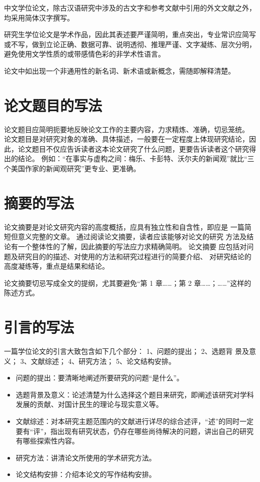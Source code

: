 中文学位论文，除古汉语研究中涉及的古文字和参考文献中引用的外文文献之外，均采用简体汉字撰写。

研究生学位论文是学术作品，因此其表述要严谨简明，重点突出，专业常识应简写或不写，做到立论正确、数据可靠、说明透彻、推理严谨、文字凝练、层次分明，避免使用文学性质的或带感情色彩的非学术性语言。

论文中如出现一个非通用性的新名词、新术语或新概念，需随即解释清楚。



\section{论文题目的写法}

论文题目应简明扼要地反映论文工作的主要内容，力求精炼、准确，切忌笼统。
论文题目是对研究对象的准确、具体描述，一般要在一定程度上体现研究结论，因此，论文题目不仅应告诉读者这本论文研究了什么问题，更要告诉读者这个研究得出的结论。
例如：“在事实与虚构之间：梅乐、卡彭特、沃尔夫的新闻观”就比“三个美国作家的新闻观研究”更专业、更准确。



\section{摘要的写法}

论文摘要是对论文研究内容的高度概括，应具有独立性和自含性，即应是 一篇简短但意义完整的文章。
通过阅读论文摘要，读者应该能够对论文的研究 方法及结论有一个整体性的了解，因此摘要的写法应力求精确简明。
论文摘要 应包括对问题及研究目的的描述、对使用的方法和研究过程进行的简要介绍、 对研究结论的高度凝练等，重点是结果和结论。

论文摘要切忌写成全文的提纲，尤其要避免“第 1 章……；第 2 章……；……”这样的陈述方式。



\section{引言的写法}

一篇学位论文的引言大致包含如下几个部分：
1、问题的提出；
2、选题背 景及意义；
3、文献综述；
4、研究方法；
5、论文结构安排。
\begin{itemize}
  \item 问题的提出：要清晰地阐述所要研究的问题“是什么”。
  \item 选题背景及意义：论述清楚为什么选择这个题目来研究，即阐述该研究对学科发展的贡献、对国计民生的理论与现实意义等。
  \item 文献综述：对本研究主题范围内的文献进行详尽的综合述评，“述”的同时一定要有“评”，指出现有研究状态，仍存在哪些尚待解决的问题，讲出自己的研究有哪些探索性内容。
  \item 研究方法：讲清论文所使用的学术研究方法。
  \item 论文结构安排：介绍本论文的写作结构安排。
\end{itemize}



